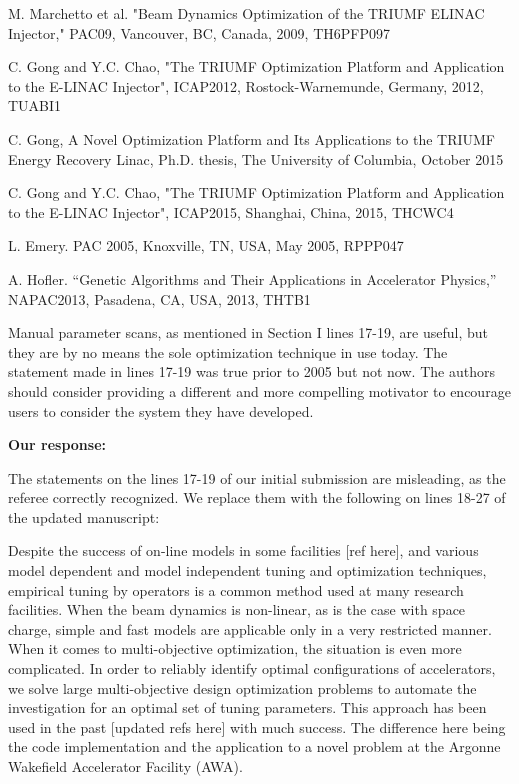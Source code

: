 \documentclass{article}
\begin{document}
M. Marchetto et al. "Beam Dynamics Optimization of the TRIUMF ELINAC
Injector," PAC09, Vancouver, BC, Canada, 2009, TH6PFP097

C. Gong and Y.C. Chao, "The TRIUMF Optimization Platform and
Application to the E-LINAC Injector", ICAP2012, Rostock-Warnemunde,
Germany, 2012, TUABI1

C. Gong, A Novel Optimization Platform and Its Applications to the
TRIUMF Energy Recovery Linac, Ph.D. thesis, The University of
Columbia, October 2015

C. Gong and Y.C. Chao, "The TRIUMF Optimization Platform and
Application to the E-LINAC Injector", ICAP2015, Shanghai, China, 2015,
THCWC4

L. Emery. PAC 2005, Knoxville, TN, USA, May 2005, RPPP047

A. Hofler. “Genetic Algorithms and Their Applications in
Accelerator Physics,” NAPAC2013, Pasadena, CA, USA, 2013, THTB1

\vspace{1em}

Manual parameter scans, as mentioned in Section I lines 17-19, are
useful, but they are by no means the sole optimization technique in
use today. The statement made in lines 17-19 was true prior to 2005
but not now. The authors should consider providing a different and
more compelling motivator to encourage users to consider the system
they have developed.

{\bf Our response:} {\color{blue} The statements on the lines  17-19 of our initial submission are misleading, as
the referee correctly recognized. We replace them with the following on lines 18-27 of the updated manuscript:  

Despite the success of on-line models in some facilities [ref here], 
and various model dependent and model independent tuning and optimization techniques, 
empirical tuning by operators is a common method used at many research facilities.
When the beam dynamics is non-linear, as is the case with space charge, 
simple and fast models are applicable only in a very restricted manner. 
When it comes to multi-objective optimization, the situation is even more complicated.
In order to reliably identify optimal configurations of
accelerators, we solve large multi-objective design optimization
problems to automate the investigation for an optimal set of tuning parameters.
This approach has been used in the past [updated refs here] with much success.
The difference here being the code implementation and the application to a novel
problem at the Argonne Wakefield Accelerator Facility (AWA).
}
\end{document}
